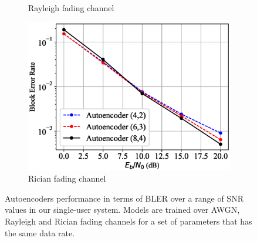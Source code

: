 \begin{figure}[!tp]
\begin{subfigure}{0.28\textwidth}
		\caption{Rayleigh fading channel}	
	\end{subfigure}
	\begin{subfigure}{0.28\textwidth}
		\includegraphics[width=\linewidth]{figs/autoencoder_bler_rician}
		\caption{Rician fading channel}	
	\end{subfigure}
	\caption{Autoencoders performance in terms of BLER over a range of SNR values in our single-user system. Models are trained over AWGN, Rayleigh and Rician fading channels for a set of parameters that has the same data rate.}
	\label{fig:autoencoder_bler}
\end{figure}

